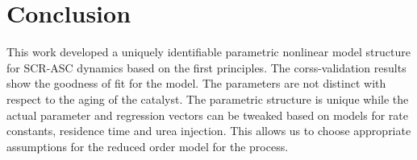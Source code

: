 \newpage
\section{Conclusion}
This work developed a uniquely identifiable parametric nonlinear model structure for SCR-ASC dynamics based on the first principles. The corss-validation results show the goodness of fit for the model. The parameters are not distinct with respect to the aging of the catalyst. The parametric structure is unique while the actual parameter and regression vectors can be tweaked based on models for rate constants, residence time and urea injection. This allows us to choose appropriate assumptions for the reduced order model for the process.
